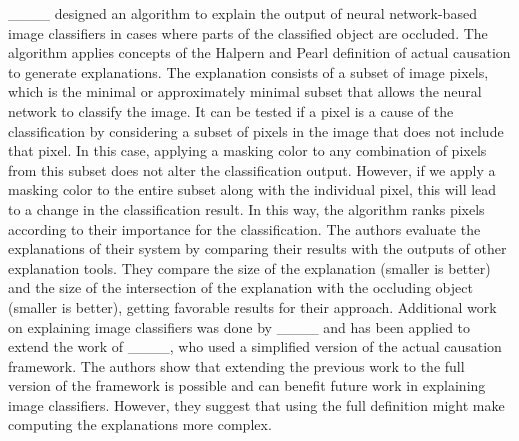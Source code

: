 	
	____ designed an algorithm to explain the output of neural network-based image classifiers in cases where parts of the classified object are occluded. The algorithm applies concepts of the Halpern and Pearl definition of actual causation to generate explanations. The explanation consists of a subset of image pixels, which is the minimal or approximately minimal subset that allows the neural network to classify the image. It can be tested if a pixel is a cause of the classification by considering a subset of pixels in the image that does not include that pixel. In this case, applying a masking color to any combination of pixels from this subset does not alter the classification output. However, if we apply a masking color to the entire subset along with the individual pixel, this will lead to a change in the classification result. In this way, the algorithm ranks pixels according to their importance for the classification. The authors evaluate the explanations of their system by comparing their results with the outputs of other explanation tools. They compare the size of the explanation (smaller is better) and the size of the intersection of the explanation with the occluding object (smaller is better), getting favorable results for their approach. Additional work on explaining image classifiers was done by ____ and has been applied to extend the work of ____, who used a simplified version of the actual causation framework. The authors show that extending the previous work to the full version of the framework is possible and can benefit future work in explaining image classifiers. However, they suggest that using the full definition might make computing the explanations more complex.